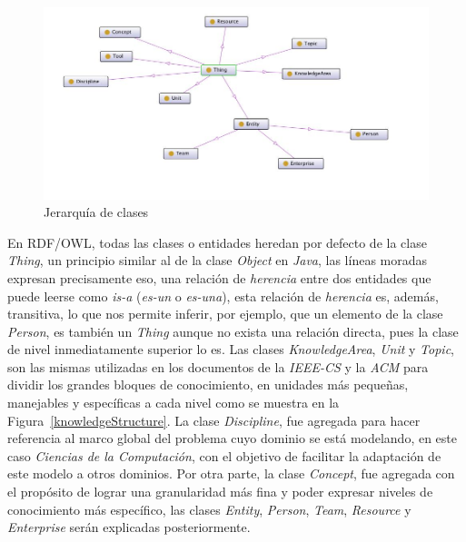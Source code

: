 \begin{itemize}
\begin{figure}[h!]
    \begin{center}
        \includegraphics[scale=0.5]{images/onto_graph_classes.jpg}
        \caption{Jerarquía de clases}
        \label{classHierarchy}
    \end{center}
\end{figure}

En RDF/OWL, todas las clases o entidades heredan por defecto de la clase \textit{Thing}, un principio similar al de la clase \textit{Object} en \textit{Java}, las líneas moradas expresan precisamente eso, una relación de \textit{herencia} entre dos entidades que puede leerse como \textit{is-a} (\textit{es-un} o \textit{es-una}), esta relación de \textit{herencia} es, además, transitiva, lo que nos permite inferir, por ejemplo, que un elemento de la clase \textit{Person}, es también un \textit{Thing} aunque no exista una relación directa, pues la clase de nivel inmediatamente superior lo es. Las clases \textit{KnowledgeArea}, \textit{Unit} y \textit{Topic}, son las mismas utilizadas en los documentos de la \textit{IEEE-CS} y la \textit{ACM} para dividir los grandes bloques de conocimiento, en unidades más pequeñas, manejables y específicas a cada nivel como se muestra en la Figura~\ref{knowledgeStructure}. La clase \textit{Discipline}, fue agregada para hacer referencia al marco global del problema cuyo dominio se está modelando, en este caso \textit{Ciencias de la Computación}, con el objetivo de facilitar la adaptación de este modelo a otros dominios. Por otra parte, la clase \textit{Concept}, fue agregada con el propósito de lograr una granularidad más fina y poder expresar niveles de conocimiento más específico, las clases \textit{Entity}, \textit{Person}, \textit{Team}, \textit{Resource} y \textit{Enterprise} serán explicadas posteriormente.


\end{itemize}
